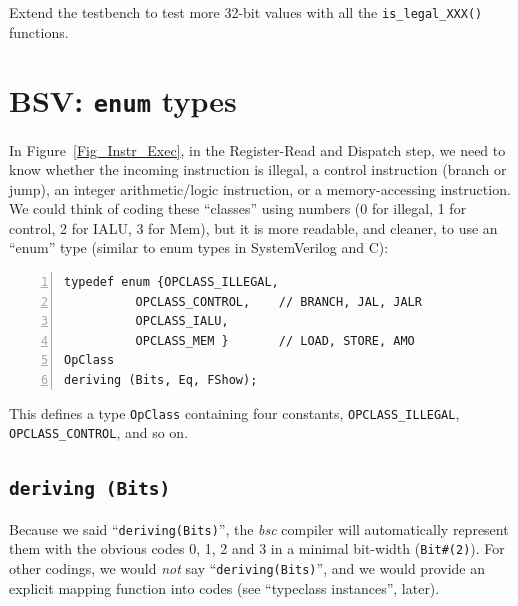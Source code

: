 \Exercise

Extend the testbench to test more 32-bit values with all the
\verb|is_legal_XXX()| functions.

\Endexercise


\section{BSV: {\tt enum} types}

\label{BSV_enum_types}


In Figure~\ref{Fig_Instr_Exec}, in the Register-Read
and Dispatch step, we need to know whether the incoming instruction is
illegal, a control instruction (branch or jump), an integer
arithmetic/logic instruction, or a memory-accessing instruction.  We
could think of coding these ``classes'' using numbers (0 for illegal,
1 for control, 2 for IALU, 3 for Mem), but it is more readable, and
cleaner, to use an ``enum'' type (similar to enum types in
SystemVerilog and C):

\begin{Verbatim}[frame=single, numbers=left]
typedef enum {OPCLASS_ILLEGAL,
	      OPCLASS_CONTROL,    // BRANCH, JAL, JALR
	      OPCLASS_IALU,
	      OPCLASS_MEM }       // LOAD, STORE, AMO
OpClass
deriving (Bits, Eq, FShow);
\end{Verbatim}

This defines a type \verb|OpClass| containing four constants,
\verb|OPCLASS_ILLEGAL|, \verb|OPCLASS_CONTROL|, and so on.


\subsection{{\tt deriving (Bits)}}


Because we said ``\verb|deriving(Bits)|'', the \emph{bsc} compiler
will automatically represent them with the obvious codes 0, 1, 2 and 3
in a minimal bit-width (\verb|Bit#(2)|).  For other codings, we would
\emph{not} say ``\verb|deriving(Bits)|'', and we would provide an
explicit mapping function into codes (see ``typeclass instances'',
later).

